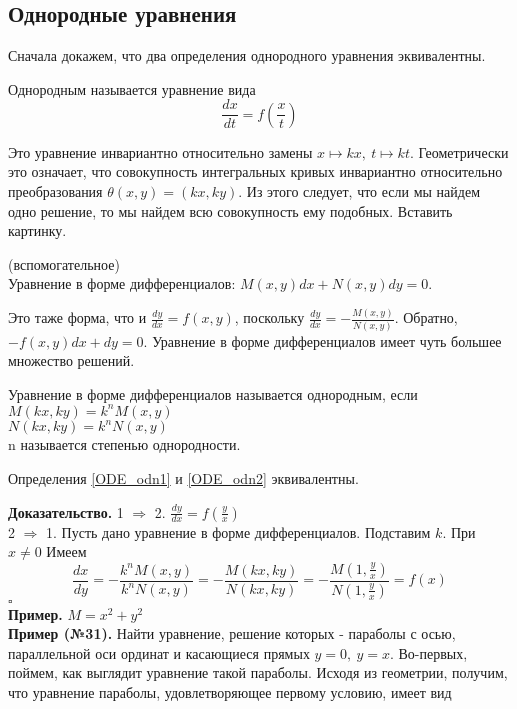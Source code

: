 \subsection{Однородные уравнения}
Сначала докажем, что два определения однородного уравнения эквивалентны.
\begin{defin}
Однородным называется уравнение вида
\begin{equation}\label{ODE_odn1}
    \frac{dx}{dt}=f\left(\frac{x}{t}\right) \label{ODE_odn1}
\end{equation} 
\end{defin}
Это уравнение инвариантно относительно замены $x\mapsto kx,~t\mapsto kt$.
Геометрически это означает, что совокупность интегральных кривых инвариантно
относительно преобразования $\theta(x,y)=(kx,ky)$.
Из этого следует, что если мы найдем одно решение, то мы найдем всю 
совокупность ему подобных. Вставить картинку.
\begin{defin}
    (вспомогательное)\\
Уравнение в форме дифференциалов:
    $M(x,y)dx+N(x,y)dy=0$.  
\end{defin}
Это таже форма, что и $\frac{dy}{dx}=f(x,y)$, поскольку 
$\frac{dy}{dx}=-\frac{M(x,y)}{N(x,y)}$. Обратно, $-f(x,y)dx+dy=0$.
Уравнение в форме дифференциалов имеет чуть большее множество решений. 
\begin{defin}\label{ODE_odn2}
Уравнение в форме дифференциалов называется однородным, если\\
$M(kx,ky)=k^nM(x,y)$\\ 
$N(kx,ky)=k^nN(x,y)$\\
n называется степенью однородности.
\end{defin}
\begin{theor}
    Определения \ref{ODE_odn1} и \ref{ODE_odn2} эквивалентны. 
\end{theor}
\textbf{Доказательство.} 1 $\Rightarrow$ 2. $\frac{dy}{dx}=f(\frac{y}{x})$\\
2 $\Rightarrow$ 1. Пусть дано уравнение в форме дифференциалов. Подставим $k$.
При $x\ne 0$ Имеем $$\frac{dx}{dy}=-\frac{k^nM(x,y)}{k^nN(x,y)}=
-\frac{M(kx,ky)}{N(kx,ky)}=-\frac{M(1,\frac{y}{x})}{N(1,\frac{y}{x})}=f(x)$$
$\square$ \\
\textbf{Пример.} $M=x^2+y^2$\\
\textbf{Пример (№31).} Найти уравнение, решение которых - параболы с осью, 
параллельной оси ординат и касающиеся прямых $y=0,~y=x$. 
Во-первых, поймем, как выглядит уравнение такой параболы. Исходя из геометрии,
получим, что уравнение параболы, удовлетворяющее первому условию, имеет вид 
